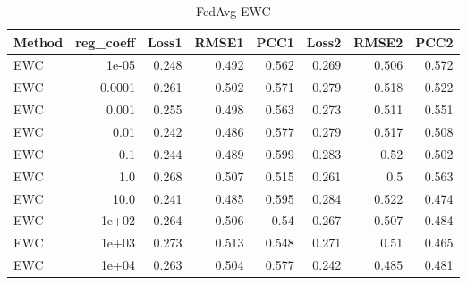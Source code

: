 \begin{table}
\caption{FedAvg-EWC}
\begin{tabular}{lrrrrrrr}
\toprule
Method & reg_coeff & Loss1 & RMSE1 & PCC1 & Loss2 & RMSE2 & PCC2 \\
\midrule
EWC & 1e-05 & 0.248 & 0.492 & 0.562 & 0.269 & 0.506 & 0.572 \\
EWC & 0.0001 & 0.261 & 0.502 & 0.571 & 0.279 & 0.518 & 0.522 \\
EWC & 0.001 & 0.255 & 0.498 & 0.563 & 0.273 & 0.511 & 0.551 \\
EWC & 0.01 & 0.242 & 0.486 & 0.577 & 0.279 & 0.517 & 0.508 \\
EWC & 0.1 & 0.244 & 0.489 & 0.599 & 0.283 & 0.52 & 0.502 \\
EWC & 1.0 & 0.268 & 0.507 & 0.515 & 0.261 & 0.5 & 0.563 \\
EWC & 10.0 & 0.241 & 0.485 & 0.595 & 0.284 & 0.522 & 0.474 \\
EWC & 1e+02 & 0.264 & 0.506 & 0.54 & 0.267 & 0.507 & 0.484 \\
EWC & 1e+03 & 0.273 & 0.513 & 0.548 & 0.271 & 0.51 & 0.465 \\
EWC & 1e+04 & 0.263 & 0.504 & 0.577 & 0.242 & 0.485 & 0.481 \\
\bottomrule
\end{tabular}
\end{table}
